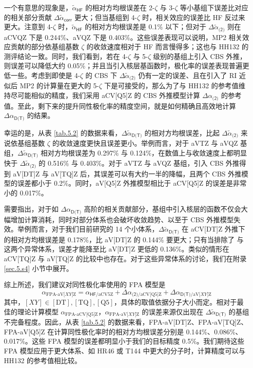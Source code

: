 一个有意思的现象是，$\tilde \alpha_\textsf{HF}$ 的相对方均根误差在 2-$\zeta$ 与 3-$\zeta$ 等小基组下误差比对应的相关部分贡献 $\Delta \tilde \alpha_\textsf{corr}$ 更大；但当基组到 4-$\zeta$ 时，相关效应的误差比 HF 反过来更大。注意到 4-$\zeta$ 时，$\tilde \alpha_\textsf{HF}$ 的相对方均根误差是 0.1\% 以下；但对于 $\Delta \tilde \alpha_\textsf{(2)}$ 则在 aCVQZ 下是 0.244\%、aVQZ 下是 0.403\%。这些误差表现可以说明，MP2 相关效应贡献的部分依基组基数 $\zeta$ 的收敛速度相对于 HF 而言慢得多；这也与 HH132 的测评结论一致\cite{Hait-Head-Gordon.PCCP.2018}。同时，我们看到，若在 4-$\zeta$ 与 5-$\zeta$ 级别的基组上引入 CBS 外推，则误差可以降低大约 0.05\%；并且当引入核层基函数时，极化率的误差表现普遍更低一些。考虑到即使是 4-$\zeta$ 的 CBS 下 $\Delta \tilde \alpha_\textsf{(2)}$ 仍有一定的误差、且在引入了 RI 近似后 MP2 的计算量在更大的 5-$\zeta$ 下是可接受的，那么为了与 HH132 的参考值维持尽可能相似的精度，我们采用 aCV[Q5]Z 的 CBS 外推模型计算 $\Delta \alpha_\textsf{(2)}$ 的参考值。至此，剩下来的提升同性极化率的精度空间，就是如何精确且高效地计算 $\Delta \alpha_\textsf{D(T)}$ 的结果。

幸运的是，从表 \ref{tab.5.2} 的数据来看，$\Delta \tilde \alpha_\textsf{D(T)}$ 的相对方均根误差，比起 $\Delta \tilde \alpha_\textsf{(2)}$ 来说依基组基数 $\zeta$ 的收敛速度更快且误差更小。举例而言，对于 aVTZ 与 aVQZ 基组，$\Delta \tilde \alpha_\textsf{D(T)}$ 相对方均根误差为 0.297\% 与 0.124\%，在数值上与收敛速度上都明显快于 $\Delta \tilde \alpha_\textsf{(2)}$ 的 0.516\% 与 0.403\%。对于 aVTZ 与 aVQZ 基组，引入 CBS 外推得到 aV[DT]Z 与 aV[TQ]Z 后，其误差可以有大约一半的降幅，且两个 CBS 外推模型的误差都小于 0.2\%。同时，aV[Q5]Z 外推模型相比于 aCV[Q5]Z 的误差是非常小的 0.017\%。

需要指出，对于如 $\Delta \alpha_\textsf{D(T)}$ 高阶的相关贡献部分，基组中引入核层的函数不仅会大幅增加计算消耗，同时对部分体系也会破坏收敛趋势、以至于 CBS 外推模型失效。举例而言，对于我们目前研究的 14 个小体系，$\Delta \tilde \alpha_\textsf{D(T)}$ 在 aCV[DT]Z 外推下的相对方均根误差是 0.178\%，比 aV[DT]Z 的 0.144\% 要更大；只有当排除了  与  这两个异常体系，误差才能降至比 aV[DT]Z 更低的 0.136\%。类似的情形在 aCV[TQ]Z 与 aV[TQ]Z 的比较中也存在。对于这些异常体系的讨论，我们在附录 \ref{sec.5.s4} 小节中展开。

综上所述，我们建议对同性极化率使用的 FPA 模型是
\begin{equation}
    \label{eq.fpa-alpha}
    \alpha_{\text{FPA-aV[}XY\text{]Z}} = \alpha_{\textsf{HF}/\text{aCV5Z}} + \Delta \alpha_{\textsf{(2)}/\text{aCV[Q5]Z}} + \Delta \alpha_{\textsf{D(T)}/\text{aV[}XY\text{]Z}}
\end{equation}
其中，$[XY] \in \mathrm{[DT], [TQ], [Q5]}$，具体的取值依据分子大小而定。相对于最佳的理论计算模型 $\alpha_{\text{FPA-aCV[Q5]Z}}$，$\alpha_{\text{FPA-aV[}XY\text{]Z}}$ 的误差来源仅出现在 $\Delta \tilde \alpha_\textsf{D(T)}$ 的基组不完备程度。因此，从表 \ref{tab.5.2} 的数据来看，FPA-aV[DT]Z、FPA-aV[TQ]Z、FPA-aV[Q5]Z 在计算同性极化率时的相对方均根误差分别是 0.144\%、0.086\%、0.017\%。这些 FPA 模型的误差都明显小于我们的目标精度 0.5\%。我们期待这些 FPA 模型应用于更大体系、如 HR46 或 T144 中更大的分子时，计算精度可以与 HH132 的参考值相比较。

